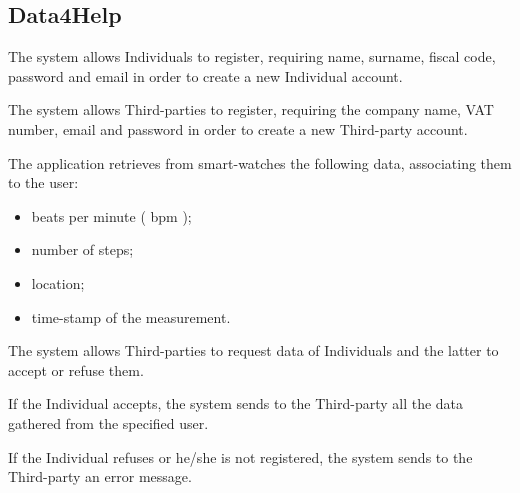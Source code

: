     \subsection{Data4Help}
\begin{enumerate}[label={[}R1.\arabic*{]}, leftmargin=*]

    \item \label{R1-Individual-registration} The system allows Individuals to register, requiring name, surname, fiscal code, password and email in order to create a new Individual account.

    \item \label{R1-third-party-registration} The system allows Third-parties to register, requiring the company name, VAT number, email and password in order to create a new Third-party account.
    
    \item \label{R1-gathered-data} The application retrieves from smart-watches the following data, associating them to the user: 
    \begin{itemize}
        \item beats per minute ( bpm );
        \item number of steps;
        \item location;
        \item time-stamp of the measurement.
    \end{itemize}
    
    \item \label{R1-individual-request} The system allows Third-parties to request data of Individuals and the latter to accept or refuse them. 
    \begin{enumerate}[label={[}R1.\arabic{enumi}.\arabic*{]}, leftmargin=*]
        \item \label{R1-individual-accept-request} If the Individual accepts, the system sends to the Third-party all the data gathered from the specified user.
    
        \item \label{R1-individual-refused-request} If the Individual refuses or he/she is not registered, the system sends to the Third-party an error message.
    \end{enumerate}
    

\end{enumerate}
